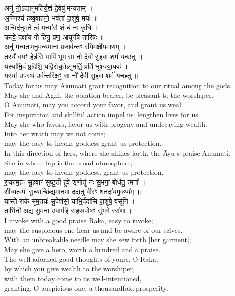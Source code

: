 \documentclass[11pt]{article}
\begin{document}
\begin{adjustwidth}{6em}{.2em}
{\large\skts\color{deepblue}
अनु॑ नो॒ऽद्यानु॑मतिर्य॒ज्ञं दे॒वेषु॑ मन्यताम् ।\\
अ॒ग्निश्च॑ हव्य॒वाह॑नो॒ भव॑तां दा॒शुषे॒ मयः॑ ॥\\
अन्विद॑नुमते॒ त्वं मन्या॑सै॒ शं च॑ नः कृधि ।\\
क्रत्वे॒ दक्षा॑य नो हिनु॒ प्रण॒ आयूꣳ॑षि तारिषः ॥\\
अनु॑ मन्यतामनु॒मन्य॑माना प्र॒जाव॑न्तꣳ र॒यिमक्षी॑यमाणम् ।\\
तस्यै॑ व॒यꣳ हेड॑सि॒ मापि॑ भूम॒ सा नो॑ दे॒वी सु॒हवा॒ शर्म॑ यच्छतु ॥\\
यस्या॑मि॒दं प्र॒दिशि॒ यद्वि॒रोच॒तेऽनु॑मतिं॒ प्रति॑ भूषन्त्या॒यवः॑ ।\\
यस्या॑ उ॒पस्थ॑ उ॒र्व॑न्तरि॑क्ष॒ꣳ॒ सा नो॑ दे॒वी सु॒हवा॒ शर्म॑ यच्छतु ॥}\\[5pt]
Today for us may Anumati grant recognition to our ritual among the gods.\\
May she and Agni, the oblation-bearer, be pleasant to the worshiper.\\
O Anumati, may you accord your favor, and grant us weal.\\
For inspiration and skillful action impel us; lengthen lives for us.\\
May she who favors, favor us with progeny and undecaying wealth.\\
Into her wrath may we not come;\\ 
may the easy to invoke goddess grant us protection.\\
In this direction of hers, where she shines forth, the Āyu-s praise Anumati.\\
She in whose lap is the broad atmosphere,\\ 
may the easy to invoke goddess, grant us protection.\\[10pt]

{\large\skts\color{deepblue}
रा॒काम॒हꣳ सु॒हवाꣳ॑ सुष्टु॒ती हु॑वे श‍ृ॒णोतु॑ नः सु॒भगा॒ बोध॑तु॒ त्मना᳚ ।\\
सीव्य॒त्वपः॑ सू॒च्याच्छि॑द्यमानया॒ ददा॑तु वी॒रꣳ श॒तदा॑यमु॒क्थ्य᳚म् ॥\\
यास्ते॑ राके सुम॒तयः॑ सु॒पेश॑सो॒ याभि॒र्ददा॑सि दा॒शुषे॒ वसू॑नि ।\\
ताभि॑र्नो अ॒द्य सु॒मना॑ उ॒पाग॑हि सहस्रपो॒षꣳ सु॑भगे॒ ररा॑णा ॥}\\[5pt]
I invoke with a good praise Rākā, easy to invoke;\\ 
may the auspicious one hear us and be aware of our selves.\\
With an unbreakable needle may she sew forth [her garment];\\
May she give a hero, worth a hundred and a praise.\\
The well-adorned good thoughts of yours, O Raka,\\
by which you give wealth to the worshiper,\\
with them today come to us well-intentioned,\\
granting, O auspicious one, a thousandfold prosperity.\\[10pt]


\end{adjustwidth}
\end{document}
